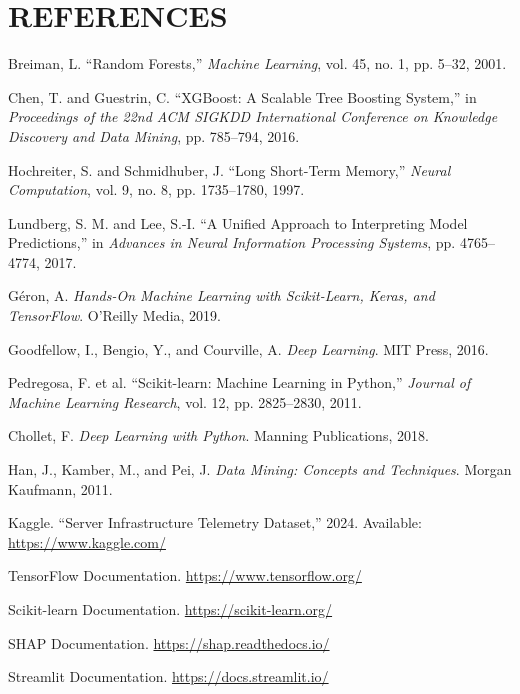 \documentclass[12pt,letterpaper]{report}
\begin{document}
\chapter*{REFERENCES}

\begin{enumerate}[label={[\arabic*]}]
  \item Breiman, L. ``Random Forests,'' \textit{Machine Learning}, vol. 45, no. 1, pp. 5--32, 2001.

  \item Chen, T. and Guestrin, C. ``XGBoost: A Scalable Tree Boosting System,'' in \textit{Proceedings of the 22nd ACM SIGKDD International Conference on Knowledge Discovery and Data Mining}, pp. 785--794, 2016.

  \item Hochreiter, S. and Schmidhuber, J. ``Long Short-Term Memory,'' \textit{Neural Computation}, vol. 9, no. 8, pp. 1735--1780, 1997.

  \item Lundberg, S. M. and Lee, S.-I. ``A Unified Approach to Interpreting Model Predictions,'' in \textit{Advances in Neural Information Processing Systems}, pp. 4765--4774, 2017.

  \item G\'{e}ron, A. \textit{Hands-On Machine Learning with Scikit-Learn, Keras, and TensorFlow}. O'Reilly Media, 2019.

  \item Goodfellow, I., Bengio, Y., and Courville, A. \textit{Deep Learning}. MIT Press, 2016.

  \item Pedregosa, F. et al. ``Scikit-learn: Machine Learning in Python,'' \textit{Journal of Machine Learning Research}, vol. 12, pp. 2825--2830, 2011.

  \item Chollet, F. \textit{Deep Learning with Python}. Manning Publications, 2018.

  \item Han, J., Kamber, M., and Pei, J. \textit{Data Mining: Concepts and Techniques}. Morgan Kaufmann, 2011.

  \item Kaggle. ``Server Infrastructure Telemetry Dataset,'' 2024. Available: \url{https://www.kaggle.com/}

  \item TensorFlow Documentation. \url{https://www.tensorflow.org/}

  \item Scikit-learn Documentation. \url{https://scikit-learn.org/}

  \item SHAP Documentation. \url{https://shap.readthedocs.io/}

  \item Streamlit Documentation. \url{https://docs.streamlit.io/}
\end{enumerate}
\end{document}
